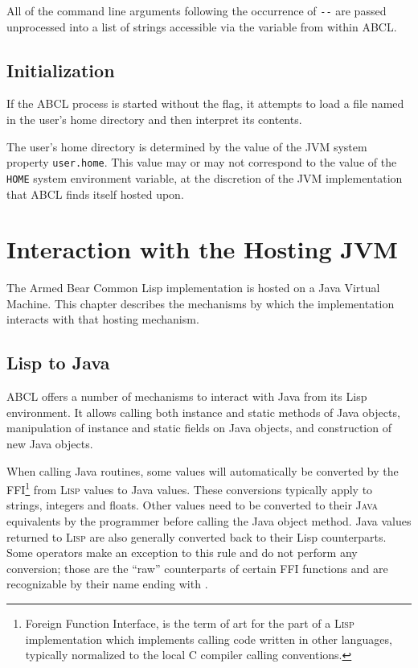 \documentclass[10pt]{book}
\begin{document}
All of the command line arguments following the occurrence of \verb+--+
are passed unprocessed into a list of strings accessible via the
variable  from within ABCL.

\section{Initialization}

If the \textsc{ABCL} process is started without the 
flag, it attempts to load a file named  in the user's home
directory and then interpret its contents.

The user's home directory is determined by the value of the JVM system
property \texttt{user.home}.  This value may or may not correspond
to the value of the \texttt{HOME} system environment variable, at the
discretion of the JVM implementation that \textsc{ABCL} finds itself
hosted upon.

\chapter{Interaction with the Hosting JVM}

%

The Armed Bear Common Lisp implementation is hosted on a Java Virtual
Machine.  This chapter describes the mechanisms by which the
implementation interacts with that hosting mechanism.

\section{Lisp to Java}
\label{sec:lisp-java}

\textsc{ABCL} offers a number of mechanisms to interact with Java from its
Lisp environment. It allows calling both instance and static methods
of Java objects, manipulation of instance and static fields on Java
objects, and construction of new Java objects.

When calling Java routines, some values will automatically be
converted by the FFI\footnote{Foreign Function Interface, is the term
  of art for the part of a \textsc{Lisp} implementation which implements
  calling code written in other languages, typically normalized to the
  local C compiler calling conventions.}  from \textsc{Lisp} values to Java
values. These conversions typically apply to strings, integers and
floats. Other values need to be converted to their \textsc{Java} equivalents by
the programmer before calling the Java object method. Java values
returned to \textsc{Lisp} are also generally converted back to their Lisp
counterparts. Some operators make an exception to this rule and do not
perform any conversion; those are the ``raw'' counterparts of certain
FFI functions and are recognizable by their name ending with
.
\end{document}

